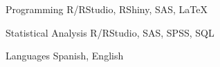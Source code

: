 

\begin{cvskills}

  \cvskill
    {Programming} %
    {R/RStudio, RShiny, SAS, LaTeX} %

  \cvskill
    {Statistical Analysis} %
    {R/RStudio, SAS, SPSS, SQL} %


  \cvskill
    {Languages} %
    {Spanish, English} %


\end{cvskills}
